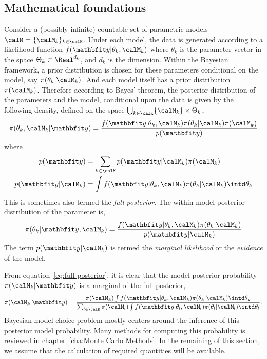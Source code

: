 \subsection{Mathematical foundations}
\label{sub:Mathematical foundations}

Consider a (possibly infinite) countable set of parametric models $\calM =
\{\calM_k\}_{k\in\calK}$. Under each model, the data is generated according to
a likelihood function $f(\data|\theta_k,\calM_k)$ where $\theta_k$ is the
parameter vector in the space $\Theta_k\subset\Real^{d_k}$, and $d_k$ is the
dimension. Within the Bayesian framework, a prior distribution is chosen for
these parameters conditional on the model, say $\pi(\theta_k|\calM_k)$. And
each model itself has a prior distribution $\pi(\calM_k)$. Therefore according
to Bayes' theorem, the posterior distribution of the parameters and the model,
conditional upon the data is given by the following density, defined on the
space $\bigcup_{k\in\calK}\{\calM_k\}\times\Theta_k$,
\begin{equation}
  \pi(\theta_k,\calM_k|\data) =
  \frac{f(\data|\theta_k,\calM_k)\pi(\theta_k|\calM_k)\pi(\calM_k)}{p(\data)}
  \label{eq:full posterior}
\end{equation}
where
\begin{align}
  p(\data) &= \sum_{k\in\calK}p(\data|\calM_k)\pi(\calM_k) \\
  p(\data|\calM_k) &=
  \int f(\data|\theta_k,\calM_k)\pi(\theta_k|\calM_k)\intd\theta_k
  \label{eq:marginal likelihood}
\end{align}
This is sometimes also termed the \emph{full posterior}. The within model
posterior distribution of the parameter is,
\begin{equation}
  \pi(\theta_k|\data,\calM_k) =
  \frac{f(\data|\theta_k,\calM_k)\pi(\theta_k|\calM_k)}{p(\data|\calM_k)}
  \label{eq:within posterior}
\end{equation}
The term $p(\data|\calM_k)$ is termed the \emph{marginal likelihood} or the
\emph{evidence} of the model.

From equation~\eqref{eq:full posterior}, it is clear that the model posterior
probability $\pi(\calM_k|\data)$ is a marginal of the full posterior,
\begin{equation}
  \pi(\calM_k|\data) =
  \frac{
    \pi(\calM_k)
    \int f(\data|\theta_k,\calM_k)\pi(\theta_k|\calM_k)\intd\theta_k
  }{
    \sum_{l\in\calK}\pi(\calM_l)
    \int f(\data|\theta_l,\calM_l)\pi(\theta_l|\calM_l)\intd\theta_l
  }.
  \label{eq:post model prob}
\end{equation}
Bayesian model choice problem mostly centers around the inference of this
posterior model probability. Many methods for computing this probability is
reviewed in chapter~\ref{cha:Monte Carlo Methods}. In the remaining of this
section, we assume that the calculation of required quantities will be
available.


